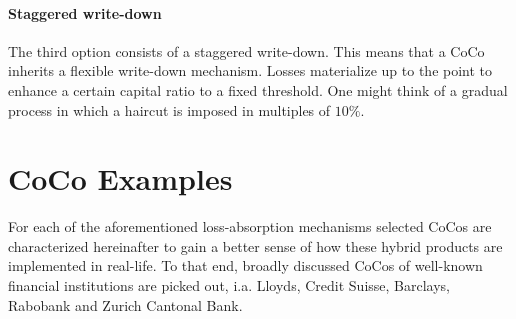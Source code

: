 \subsubsection*{Staggered write-down}
The third option consists of a staggered write-down. This means that a CoCo inherits a flexible write-down mechanism. Losses materialize up to the point to enhance a certain capital ratio to a fixed threshold. One might think of a gradual process in which a haircut is imposed in multiples of $10\%$.


\chapter{CoCo Examples} \label{examples}

For each of the aforementioned loss-absorption mechanisms selected CoCos are characterized hereinafter to gain a better sense of how these hybrid products are implemented in real-life. To that end, broadly discussed CoCos of well-known financial institutions are picked out, i.a. Lloyds, Credit Suisse, Barclays, Rabobank and Zurich Cantonal Bank.
